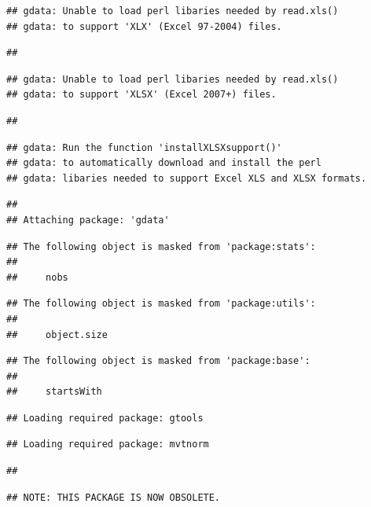 \documentclass[
]{article}
\begin{document}
\begin{verbatim}
## gdata: Unable to load perl libaries needed by read.xls()
## gdata: to support 'XLX' (Excel 97-2004) files.
\end{verbatim}

\begin{verbatim}
## 
\end{verbatim}

\begin{verbatim}
## gdata: Unable to load perl libaries needed by read.xls()
## gdata: to support 'XLSX' (Excel 2007+) files.
\end{verbatim}

\begin{verbatim}
## 
\end{verbatim}

\begin{verbatim}
## gdata: Run the function 'installXLSXsupport()'
## gdata: to automatically download and install the perl
## gdata: libaries needed to support Excel XLS and XLSX formats.
\end{verbatim}

\begin{verbatim}
## 
## Attaching package: 'gdata'
\end{verbatim}

\begin{verbatim}
## The following object is masked from 'package:stats':
## 
##     nobs
\end{verbatim}

\begin{verbatim}
## The following object is masked from 'package:utils':
## 
##     object.size
\end{verbatim}

\begin{verbatim}
## The following object is masked from 'package:base':
## 
##     startsWith
\end{verbatim}

\begin{verbatim}
## Loading required package: gtools
\end{verbatim}

\begin{verbatim}
## Loading required package: mvtnorm
\end{verbatim}

\begin{verbatim}
## 
\end{verbatim}

\begin{verbatim}
## NOTE: THIS PACKAGE IS NOW OBSOLETE.
\end{verbatim}
\end{document}
